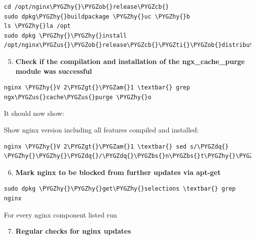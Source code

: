 \documentclass[letterpaper,10pt,english]{sphinxmanual}
\def\PYGZbs{\char`\\}
\def\PYGZus{\char`\_}
\def\PYGZob{\char`\{}
\def\PYGZcb{\char`\}}
\def\PYGZam{\char`\&}
\def\PYGZgt{\char`\>}
\def\PYGZhy{\char`\-}
\def\PYGZdq{\char`\"}
\def\PYGZti{\char`\~}
\begin{document}
\begin{Verbatim}[commandchars=\\\{\}]
cd /opt/nginx\PYGZhy{}\PYGZob{}release\PYGZcb{}
sudo dpkg\PYGZhy{}buildpackage \PYGZhy{}uc \PYGZhy{}b
ls \PYGZhy{}la /opt
sudo dpkg \PYGZhy{}\PYGZhy{}install /opt/nginx\PYGZus{}\PYGZob{}release\PYGZcb{}\PYGZti{}\PYGZob{}distribution\PYGZcb{}\PYGZus{}amd64.deb
\end{Verbatim}
\begin{enumerate}
\setcounter{enumi}{4}
\item {} 
\textbf{Check if the compilation and installation of the ngx\_cache\_purge module
was successful}

\end{enumerate}

\begin{Verbatim}[commandchars=\\\{\}]
nginx \PYGZhy{}V 2\PYGZgt{}\PYGZam{}1 \textbar{} grep ngx\PYGZus{}cache\PYGZus{}purge \PYGZhy{}o
\end{Verbatim}

It should now show: 

Show nginx version including all features compiled and installed:

\begin{Verbatim}[commandchars=\\\{\}]
nginx \PYGZhy{}V 2\PYGZgt{}\PYGZam{}1 \textbar{} sed s/\PYGZdq{} \PYGZhy{}\PYGZhy{}\PYGZdq{}/\PYGZdq{}\PYGZbs{}n\PYGZbs{}t\PYGZhy{}\PYGZhy{}\PYGZdq{}/g
\end{Verbatim}
\begin{enumerate}
\setcounter{enumi}{5}
\item {} 
\textbf{Mark nginx to be blocked from further updates via apt-get}

\end{enumerate}

\begin{Verbatim}[commandchars=\\\{\}]
sudo dpkg \PYGZhy{}\PYGZhy{}get\PYGZhy{}selections \textbar{} grep nginx
\end{Verbatim}

For every nginx component listed run 
\begin{enumerate}
\setcounter{enumi}{6}
\item {} 
\textbf{Regular checks for nginx updates}

\end{enumerate}
\end{document}
